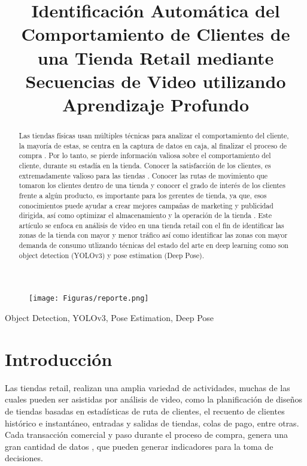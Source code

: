 \documentclass[conference]{IEEEtran}
\author{\IEEEauthorblockN{Paul Percca, Ivan Sipiran} 
\IEEEauthorblockA{Pontificia Universidad Católica del Perú}
\IEEEauthorblockA{Lima, Perú}
\IEEEauthorblockA{cristian.percca@pucp.edu.pe, isipiran@pucp.edu.pe}
}
\title{Identificación Automática del Comportamiento de Clientes de una Tienda Retail mediante Secuencias de Video utilizando Aprendizaje Profundo}
\begin{document}
\begin{figure}[hbtp]
\centering
\texttt{[image: Figuras/reporte.png]}
\end{figure}

\maketitle

\begin{abstract}
Las tiendas físicas usan múltiples técnicas para analizar el comportamiento del cliente, la mayoría de estas, se centra en la captura de datos en caja, al finalizar el proceso de compra \cite{boucouvalas2015integrating}. Por lo tanto, se pierde información valiosa sobre el comportamiento del cliente, durante su estadía en la tienda. Conocer la satisfacción de los clientes, es extremadamente valioso para las tiendas \cite{karim2018customer}.
Conocer las rutas de movimiento que tomaron los clientes dentro de una tienda y conocer el grado de interés de los clientes frente a algún producto, es importante para los gerentes de tienda, ya que, esos conocimientos puede ayudar a crear mejores campañas de marketing y publicidad dirigida, así como optimizar el almacenamiento y la operación de la tienda \cite{yaeli2014understanding}. Este artículo se enfoca en análisis de video en una tienda retail con el fin de identificar las zonas de la tienda con mayor y menor tráfico así como identificar las zonas con mayor demanda de consumo utlizando técnicas del estado del arte en deep learning como son object detection (YOLOv3) y pose estimation (Deep Pose).

\end{abstract}

\begin{IEEEkeywords}
Object Detection, YOLOv3, Pose Estimation, Deep Pose
\end{IEEEkeywords}

\section{Introducción}
Las tiendas retail, realizan una amplia variedad de actividades, muchas de las cuales pueden ser asistidas por análisis de video, como la planificación de diseños de tiendas basadas en estadísticas de ruta de clientes, el recuento de clientes histórico e instantáneo, entradas y salidas de tiendas, colas de pago, entre otras. Cada transacción comercial y paso durante el proceso de compra, genera una gran cantidad de datos \cite{provost2013data}, que pueden generar indicadores para la toma de decisiones.
\end{document}
